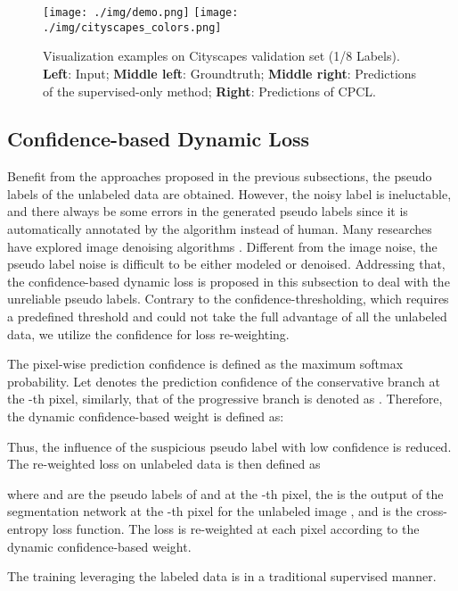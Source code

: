 \documentclass[journal]{IEEEtran}
\begin{document}
\begin{figure*}
  \centering
  \texttt{[image: ./img/demo.png]}
  \texttt{[image: ./img/cityscapes\_colors.png]}
  \caption{Visualization examples on Cityscapes validation set (1/8 Labels). \textbf{Left}: Input; \textbf{Middle left}: Groundtruth; \textbf{Middle right}: Predictions of the 
  supervised-only method; \textbf{Right}: Predictions of CPCL.}
  \label{fig:cs_demo}
\end{figure*}

\subsection{Confidence-based Dynamic Loss}

Benefit from the approaches proposed in the previous subsections, the pseudo labels of the unlabeled data are obtained. However, the noisy label is ineluctable, 
and there always be some errors in the generated pseudo labels since it is automatically annotated by the algorithm instead of human. Many researches have explored 
image denoising algorithms \cite{5504216, 7577781}. Different from the image noise, the pseudo label noise is difficult to be either modeled or denoised. Addressing that, the 
confidence-based dynamic loss is proposed in this subsection to deal with the unreliable pseudo labels. Contrary to the confidence-thresholding, which requires a 
predefined threshold and could not take the full advantage of all the unlabeled data, we utilize the confidence for loss re-weighting. 

The pixel-wise prediction confidence is defined as the maximum softmax probability. Let  denotes the prediction confidence of the conservative branch at the -th 
pixel, similarly, that of the progressive branch is denoted as . Therefore, the dynamic confidence-based weight is defined as:



Thus, the influence of the suspicious pseudo label with low confidence is reduced. The re-weighted loss on unlabeled data  is then defined as


where  and  are the pseudo labels of  and  at the -th pixel, the  is the output of the 
segmentation network at the -th pixel for the unlabeled image , and  is the cross-entropy loss function. The loss is re-weighted at each pixel 
according to the dynamic confidence-based weight.

The training leveraging the labeled data is in a traditional supervised manner.
\end{document}
